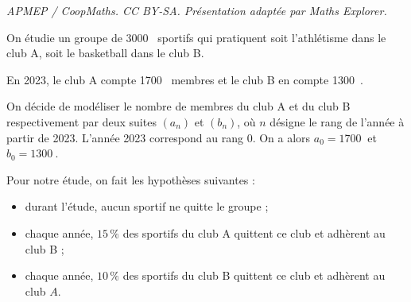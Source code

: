 \documentclass[10pt]{article}
\providecommand{\np}[2][]{{#2~#1}}
\begin{document}
\noindent\textit{APMEP / CoopMaths. CC BY-SA. Présentation adaptée par Maths Explorer.}\par\medskip
\medskip

On étudie un groupe de \np{3000} sportifs qui pratiquent soit l'athlétisme dans le club A, soit le basketball dans le club B.

En 2023, le club A compte \np{1700} membres et le club B en compte \np{1300}.



On décide de modéliser le nombre de membres du club A et du club B respectivement par deux suites $\left(a_{n}\right)$ et $\left(b_{n}\right)$, où $n$ désigne le rang de l'année à partir de 2023.
L'année 2023 correspond au rang 0. On a alors $a_{0}= \np{1700}$ et $b_{0} = \np{1300}$.

Pour notre étude, on fait les hypothèses suivantes :
\begin{itemize}
\item durant l'étude, aucun sportif ne quitte le groupe ;
\item chaque année, $15\,\%$ des sportifs du club A quittent ce club et adhèrent au club B ;
\item chaque année, $10\,\%$ des sportifs du club B quittent ce club et adhèrent au club $A$.
\end{itemize}
\end{document}
